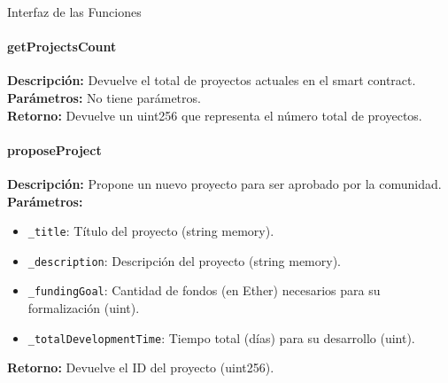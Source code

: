 \newpage

{\huge Interfaz de las Funciones}

\paragraph{getProjectsCount}
\noindent
\textbf{Descripción:}
Devuelve el total de proyectos actuales en el smart contract.\\
\textbf{Parámetros:}
No tiene parámetros. \\
\textbf{Retorno:}
Devuelve un uint256 que representa el número total de proyectos.

\paragraph{proposeProject}
\noindent
\textbf{Descripción:}
Propone un nuevo proyecto para ser aprobado por la comunidad. \\
\textbf{Parámetros:}
\begin{itemize}
    \item \texttt{\_title}: Título del proyecto (string memory).
    \item \texttt{\_description}: Descripción del proyecto (string memory).
    \item \texttt{\_fundingGoal}: Cantidad de fondos (en Ether) necesarios para su formalización (uint).
    \item \texttt{\_totalDevelopmentTime}: Tiempo total (días) para su desarrollo (uint).
\end{itemize}
\textbf{Retorno:}
Devuelve el ID del proyecto (uint256).

